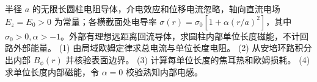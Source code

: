 半径 \(a\) 的无限长圆柱电阻导体，介电效应和位移电流忽略，轴向直流电场 \(E_z=E_0>0\) 为常量；各横截面处电导率 \(\sigma(r)=\sigma_0[1+\alpha(r/a)^2]\)，其中 \(\sigma_0>0,\alpha>-1\)。外部有理想远距离回流导体，求圆柱内部单位长度磁能，不计回路外部能量。
(1) 由局域欧姆定律求总电流与单位长度电阻。
(2) 从安培环路积分出内部 \(B_\phi(r)\) 并核验表面边界。
(3) 计算每单位长度的焦耳热和欧姆损耗。
(4) 求单位长度内部磁能，令 \(\alpha=0\) 校验熟知内部电感。
